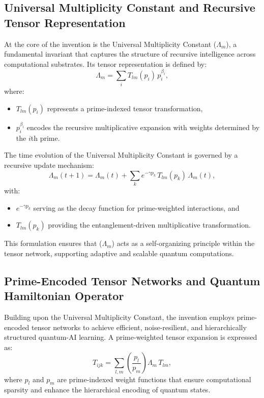 \documentclass{article}
\theoremstyle{plain}
\begin{document}
\subsection{Universal Multiplicity Constant and Recursive Tensor Representation}
At the core of the invention is the Universal Multiplicity Constant ($\Lambda_m$), a fundamental invariant that captures the structure of recursive intelligence across computational substrates. Its tensor representation is defined by:
\begin{equation}
\Lambda_m = \sum_{i} T_{lm}(p_i) \, p_i^{\beta_i},
\end{equation}
where:
\begin{itemize}
    \item \(T_{lm}(p_i)\) represents a prime-indexed tensor transformation,
    \item \(p_i^{\beta_i}\) encodes the recursive multiplicative expansion with weights determined by the \(i\)th prime.
\end{itemize}

The time evolution of the Universal Multiplicity Constant is governed by a recursive update mechanism:
\begin{equation}
\Lambda_m(t+1) = \Lambda_m(t) + \sum_{k} e^{-\gamma p_k} \, T_{lm}(p_k) \, \Lambda_m(t),
\end{equation}
with:
\begin{itemize}
    \item \(e^{-\gamma p_k}\) serving as the decay function for prime-weighted interactions, and
    \item \(T_{lm}(p_k)\) providing the entanglement-driven multiplicative transformation.
\end{itemize}
This formulation ensures that ($\Lambda_m$) acts as a self-organizing principle within the tensor network, supporting adaptive and scalable quantum computations.

\subsection{Prime-Encoded Tensor Networks and Quantum Hamiltonian Operator}
Building upon the Universal Multiplicity Constant, the invention employs prime-encoded tensor networks to achieve efficient, noise-resilient, and hierarchically structured quantum-AI learning. A prime-weighted tensor expansion is expressed as:
\begin{equation}
T_{ijk} = \sum_{l,m} \left( \frac{p_l}{p_m} \right) \Lambda_m \, T_{lm},
\end{equation}
where \(p_l\) and \(p_m\) are prime-indexed weight functions that ensure computational sparsity and enhance the hierarchical encoding of quantum states.
\end{document}
